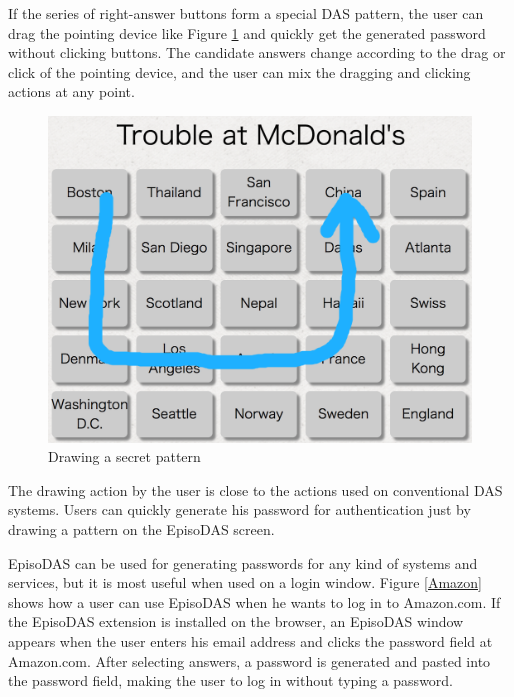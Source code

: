 \documentclass[sigconf]{acmart}
\begin{document}
If the series of right-answer buttons form a special DAS pattern,
the user can drag the pointing device like
Figure \ref{draw} and quickly get the generated
password without clicking buttons.
%
The candidate answers change according to the drag or click of the
pointing device, and the user can mix the dragging and clicking actions
at any point.

\begin{figure}[H]
  \includegraphics[width=12cm,bb=0 0 1130 1236]{figures/draw.png}
  \caption{Drawing a secret pattern}
  \label{draw}
\end{figure}

The drawing action by the user is close to the actions
used on conventional DAS systems.
Users can quickly generate his password for authentication
just by
drawing a pattern on the EpisoDAS screen.

EpisoDAS can be used for generating passwords for any kind of systems and
services, but it is most useful when used on a login window.
Figure \ref{Amazon} shows how a user can use EpisoDAS when
he wants to log in to Amazon.com.
If the EpisoDAS extension is installed on the browser,
an EpisoDAS window appears when the user enters his
email address and clicks the password field at Amazon.com.
After selecting answers, a password is generated and pasted
into the password field, making the user to log in without typing a password.

\end{document}
